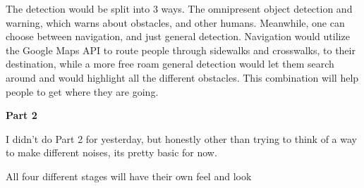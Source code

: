 \documentclass{article}
\begin{document}
The detection would be split into 3 ways. The omnipresent object detection and warning, which warns about obstacles, and other humans. Meanwhile, one can choose between navigation, and just general detection. Navigation would utilize the Google Maps API to route people through sidewalks and crosswalks, to their destination, while a more free roam general detection would let them search around and would highlight all the different obstacles. This combination will help people to get where they are going.

\textbf{Part 2}

I didn't do Part 2 for yesterday, but honestly other than trying to think of a way to make different noises, its pretty basic for now. 

All four different stages will have their own feel and look
\end{document}
